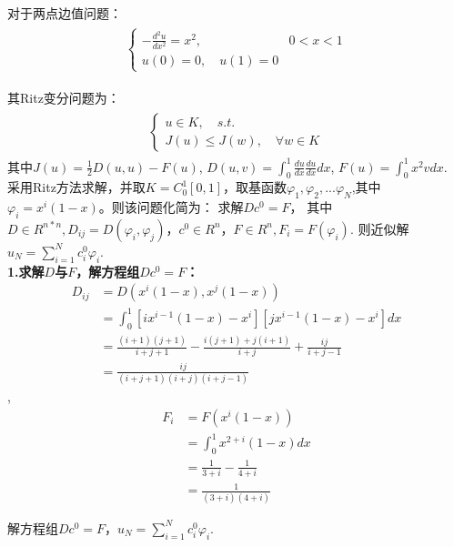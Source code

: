 \documentclass[UTF8]{ctexart}
\begin{document}
	对于两点边值问题：
	\begin{align*}
		\begin{split}
			\left\{
				\begin{array}{ll}
					-\frac{d^2 u}{dx^2}=x^2, &0<x<1\\
					u(0)=0,\quad u(1)=0
				\end{array}
			\right.
		\end{split}
	\end{align*}

	其Ritz变分问题为：
	\begin{align*}
		\begin{split}
			\left\{
			\begin{array}{lr}
				u\in K,\quad s.t.\\
				J(u)\leq J(w), \quad \forall w \in K
			\end{array}
			\right.
		\end{split}
	\end{align*}
	其中$J(u)=\frac{1}{2}D(u,u)-F(u)$,\quad
	$D(u,v)=\int_0^1 \frac{du}{dx} \frac{du}{dx} dx$,\quad
	$F(u)=\int_0^1 x^2 v dx$.
	~\\
	
	
	采用Ritz方法求解，并取$K=C_0^1[0,1]$，取基函数$\varphi_1,\varphi_2,...\varphi_N$,其中$\varphi_i=x^i(1-x)$。则该问题化简为：
	求解$Dc^0=F$，\newline
	其中$D\in R^{n*n},D_{ij}=D(\varphi_i,\varphi_j)$，$c^0\in R^n$，$F\in R^n,F_i=F(\varphi_i)$.\newline
	则近似解$u_N=\sum_{i=1}^{N}c^0_i \varphi_i$.
	~\\
	
	\textbf{1.求解$D$与$F$，解方程组$Dc^0=F$：}
		\begin{align*}
			D_{ij} &=D(x^i(1-x),x^j(1-x))\\
			&=\int_{0}^{1}[ix^{i-1}(1-x)-x^i][jx^{i-1}(1-x)-x^i]dx\\
			&=\frac{(i+1)(j+1)}{i+j+1}-\frac{i(j+1)+j(i+1)}{i+j}+\frac{ij}{i+j-1}\\
			&=\frac{ij}{(i+j+1)(i+j)(i+j-1)}
		\end{align*},
		\begin{align*}
			F_i &=F(x^i(1-x))\\
			&=\int_{0}^{1}x^{2+i}(1-x)dx\\
			&=\frac{1}{3+i}-\frac{1}{4+i}\\
			&=\frac{1}{(3+i)(4+i)}
		\end{align*}
	
		解方程组$Dc^0=F$，$u_N=\sum_{i=1}^{N}c^0_i \varphi_i$.
		~\\
			
\end{document}
